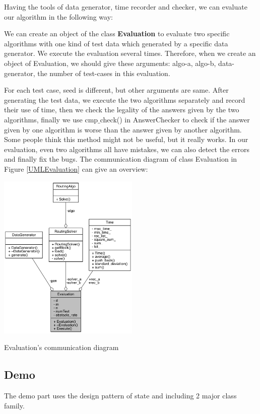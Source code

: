 \documentclass[twocolumn]{article}
\begin{document}
Having the tools of data generator, time recorder and checker, we can evaluate our algorithm in the following way:

We can create an object of the class \textbf{Evaluation} to evaluate two specific algorithms with one kind of test data which generated by a specific data generator. We execute the evaluation several times. Therefore, when we create an object of Evaluation, we should give these arguments: algo-a, algo-b, data-generator, the number of test-cases in this evaluation.

For each test case, seed is different, but other arguments are same. After generating the test data, we execute the two algorithms separately and record their use of time, then we check the legality of the answers given by the two algorithms, finally we use cmp$\_$check() in AnswerChecker to check if the answer given by one algorithm is worse than the answer given by another algorithm. Some people think this method might not be useful, but it really works. In our evaluation, even two algorithms all have mistakes, we can also detect the errors and finally fix the bugs. The communication diagram of class Evaluation in Figure \ref{UMLEvaluation} can give an overview:

\begin{center}
\makeatletter
\def\@captype{figure}
\makeatother
\includegraphics [height=8cm]{UMLEvaluation}
\caption{Evaluation's communication diagram}
\label{UMLEvaluation}
\end{center}

\subsection{Demo}

The demo part uses the design pattern of state and including 2 major class family.
\end{document}
